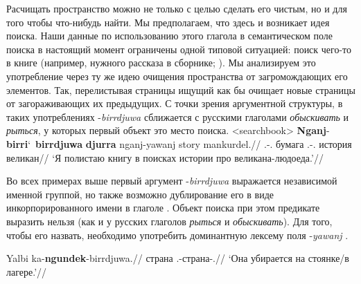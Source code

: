 Расчищать пространство можно не только с целью сделать его чистым, но и для того чтобы что-нибудь найти. Мы предполагаем, что здесь и возникает идея поиска. Наши данные по использованию этого глагола в семантическом поле поиска в настоящий момент ограничены одной типовой ситуацией: поиск чего-то в книге (например, нужного рассказа в сборнике; ). Мы анализируем это употребление через ту же идею %
очищения пространства от загромождающих его элементов.
Так, перелистывая страницы ищущий как бы очищает новые страницы от загораживающих их предыдущих. %
С точки зрения аргументной структуры, в таких употреблениях -\textit{birrdjuwa} сближается с русскими глаголами \textit{обыскивать} и \textit{рыться}, у которых первый объект это место поиска.
\ex<searchbook>\begingl
\gla \textbf{Nganj}-\textbf{birri}\char`~\textbf{birrdjuwa} \textbf{djurra} nganj-yawanj story mankurdel.//
\glb \Fsg.\Fut-\rdp\bdj.\Np{} бумага \Fsg.\Fut-\yaw.\Np{} история великан//
\glft `Я полистаю книгу в поисках истории про великана-людоеда.'//%
\endgl\xe

Во всех примерах выше первый аргумент -\textit{birrdjuwa} выражается независимой именной группой, но также возможно дублирование его в виде инкорпорированного имени в глаголе .
Объект поиска при этом предикате выразить нельзя (как и у русских глаголов \textit{рыться} и \textit{обыскивать}). Для того, чтобы его назвать, необходимо употребить доминантную лексему поля -\textit{yawanj} .

\begingl
\gla Yalbi ka-\textbf{ngundek}-birrdjuwa.//
\glb страна \Tsg.\Real-страна-\bdj.\Np{}//
\glft `Она убирается на стоянке/в лагере.'\trailingcitation{[Coleman~2010:17]}//
\endgl\xe

